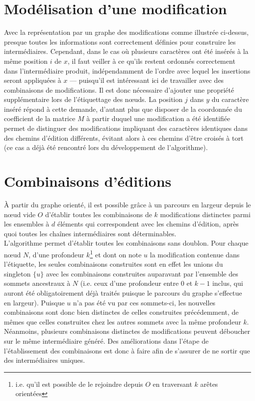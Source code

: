\documentclass[12pt, twoside]{report}
\begin{document}
\section{Modélisation d'une modification}

Avec la représentation par un graphe des modifications comme illustrée ci-dessus, presque toutes les informations sont correctement définies pour construire les intermédiaires. Cependant, dans le cas où plusieurs caractères ont été insérés à la même position $i$ de $x$, il faut veiller à ce qu'ils restent ordonnés correctement dans l'intermédiaire produit, indépendamment de l'ordre avec lequel les insertions seront appliquées à $x$ --- puisqu'il est intéressant ici de travailler avec des combinaisons de modifications. Il est donc nécessaire d'ajouter une propriété supplémentaire lors de l'étiquettage des n\oe{}uds. La position $j$ dans $y$ du caractère inséré répond à cette demande, d'autant plus que disposer de la coordonnée du coefficient de la matrice $M$ à partir duquel une modification a été identifiée permet de distinguer des modifications impliquant des caractères identiques dans des chemins d'édition différents, évitant alors à ces chemins d'être croisés à tort (ce cas a déjà été rencontré lors du développement de l'algorithme).

\section{Combinaisons d'éditions}

À partir du graphe orienté, il est possible grâce à un parcours en largeur depuis le n\oe{}ud vide $O$ d'établir toutes les combinaisons de $k$ modifications distinctes parmi les ensembles à $d$ éléments qui correspondent avec les chemins d'édition, après quoi toutes les chaînes intermédiaires sont déterminables.\\
L'algorithme permet d'établir toutes les combinaisons sans doublon. Pour chaque n\oe{}ud $N$, d'une profondeur $k$\footnote{i.e. qu'il est possible de le rejoindre depuis $O$ en traversant $k$ arêtes orientées} et dont on note $u$ la modification contenue dans l'étiquette, les seules combinaisons construites sont en effet les unions du singleton $\{u\}$ avec les combinaisons construites auparavant par l'ensemble des sommets ancestraux à $N$ (i.e. ceux d'une profondeur entre 0 et $k-1$ inclus, qui auront été obligatoirement déjà traités puisque le parcours du graphe s'effectue en largeur). Puisque $u$ n'a pas été vu par ces sommets-ci, les nouvelles combinaisons sont donc bien distinctes de celles construites précédemment, de mêmes que celles construites chez les autres sommets avec la même profondeur $k$.\\
Néanmoins, plusieurs combinaisons distinctes de modifications peuvent déboucher sur le même intermédiaire généré. Des améliorations dans l'étape de l'établissement des combinaisons est donc à faire afin de s'assurer de ne sortir que des intermédiaires uniques.\\
\end{document}
